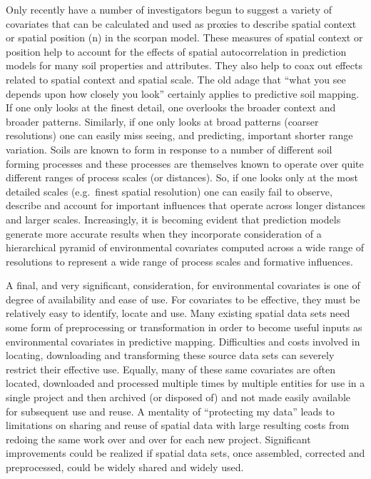 \documentclass[graybox,natbib,nospthms,UStrade]{svmono}
\begin{document}
Only recently have a number of investigators begun to suggest a variety
of covariates that can be calculated and used as proxies to describe
spatial context or spatial position (n) in the scorpan model. These
measures of spatial context or position help to account for the effects
of spatial autocorrelation in prediction models for many soil properties
and attributes. They also help to coax out effects related to spatial
context and spatial scale. The old adage that ``what you see depends upon
how closely you look'' certainly applies to predictive soil mapping. If
one only looks at the finest detail, one overlooks the broader context
and broader patterns. Similarly, if one only looks at broad patterns
(coarser resolutions) one can easily miss seeing, and predicting,
important shorter range variation. Soils are known to form in response
to a number of different soil forming processes and these processes are
themselves known to operate over quite different ranges of process
scales (or distances). So, if one looks only at the most detailed scales
(e.g.~finest spatial resolution) one can easily fail to observe,
describe and account for important influences that operate across longer
distances and larger scales. Increasingly, it is becoming evident that
prediction models generate more accurate results when they incorporate
consideration of a hierarchical pyramid of environmental covariates
computed across a wide range of resolutions to represent a wide range of
process scales and formative influences.

A final, and very significant, consideration, for environmental
covariates is one of degree of availability and ease of use. For
covariates to be effective, they must be relatively easy to identify,
locate and use. Many existing spatial data sets need some form of
preprocessing or transformation in order to become useful inputs as
environmental covariates in predictive mapping. Difficulties and costs
involved in locating, downloading and transforming these source data
sets can severely restrict their effective use. Equally, many of these
same covariates are often located, downloaded and processed multiple
times by multiple entities for use in a single project and then archived
(or disposed of) and not made easily available for subsequent use and
reuse. A mentality of ``protecting my data'' leads to limitations on
sharing and reuse of spatial data with large resulting costs from
redoing the same work over and over for each new project. Significant
improvements could be realized if spatial data sets, once assembled,
corrected and preprocessed, could be widely shared and widely used.
\end{document}
